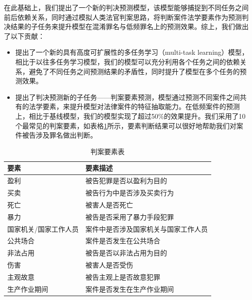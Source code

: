 在此基础上，我们提出了一个新的判决预测模型，该模型能够捕捉到不同任务之间前后依赖关系，同时通过模拟人类法官判案思路，将判断案件法学要素作为预测判决结果的子任务来提升模型在混淆罪名与低频罪名上的预测效果。综上，我们做出了以下贡献：

\begin{itemize}
	\item 提出了一个新的具有高度可扩展性的多任务学习（multi-task learning）模型，相比于以往多任务学习模型，我们的模型可以充分利用各个任务之间的依赖关系，避免了不同任务之间预测结果的矛盾性，同时提升了模型在多个任务的预测效果。
	\item 提出了判决预测新的子任务——判案要素预测，模型通过预测不同案件之间共有的法学要素，来提升模型对法律案件的特征抽取能力。在低频案件的预测上，相比于基线模型，我们的模型实现了超过50\%的效果提升。我们采用了10个最常见的判案要素，如表格\ref{tab:key_elements}所示，要素判断结果可以很好地帮助我们对案件被告涉及罪名做出判断。
	\end{itemize}

\begin{table}[]
\center
\begin{tabular}{l|l}
\hline
\textbf{要素}          & \textbf{要素描述}   \\ \hline
盈利          & 被告犯罪是否以盈利为目的       \\
买卖          & 被告行为中是否涉及买卖行为      \\
死亡          & 被害人是否死亡            \\
暴力          & 被告是否采用了暴力手段犯罪      \\
国家机关/国家工作人员 & 案件中是否涉及国家机关与国家工作人员 \\
公共场合        & 案件是否发生在公共场合        \\
非法占用        & 被告是否以非法占用为目的       \\
伤害          & 被害人是否受伤            \\
主观故意        & 被告主观上是否故意犯罪        \\
生产作业期间      & 案件是否发生在生产作业期间  \\ \hline   
\end{tabular}
\label{tab:key_elements}
\caption{判案要素表}
\end{table}


